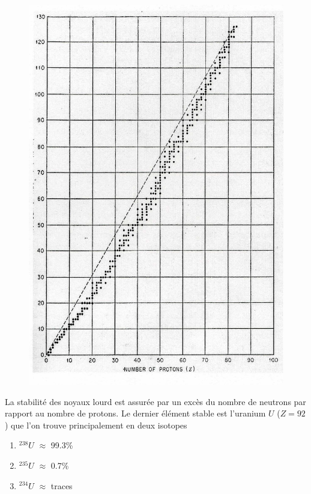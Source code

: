 	\begin{figure}
	\vspace{-5mm}
	\includegraphics[scale=0.1]{ch1/image1.png}
	\end{figure}
La stabilité des noyaux lourd est assurée par un excès du nombre de neutrons par rapport au 
nombre de protons. Le dernier élément stable est l'uranium $U$ ($Z=92$) que l'on trouve 
principalement en deux isotopes
\begin{enumerate}
\item $ ^{238}U$ $\approx$ 99.3\%
\item $ ^{235}U$ $\approx$ 0.7\%
\item $ ^{234}U$ $\approx$ traces
\end{enumerate}

